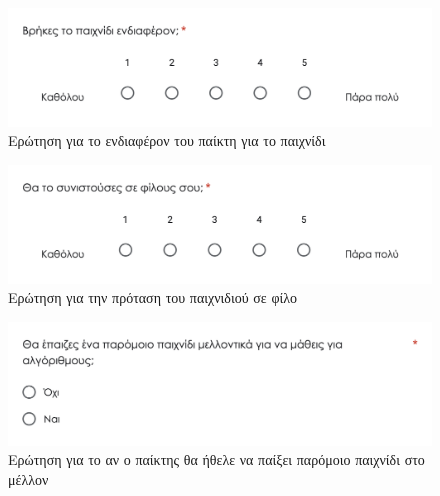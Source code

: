 \begin{figure}[H]
    \centering
    \includegraphics[width=0.8\linewidth]{sections/appendices/b/images/survey_game_interest}
    \caption{Ερώτηση για το ενδιαφέρον του παίκτη για το παιχνίδι}
    \label{fig:survey_game_interest}
\end{figure}

\begin{figure}[H]
    \centering
    \includegraphics[width=0.8\linewidth]{sections/appendices/b/images/survey_friend_reccomendation}
    \caption{Ερώτηση για την πρόταση του παιχνιδιού σε φίλο}
    \label{fig:survey_friend_reccomendation}
\end{figure}

\begin{figure}[H]
    \centering
    \includegraphics[width=0.8\linewidth]{sections/appendices/b/images/survey_similar_game_in_the_future}
    \caption{Ερώτηση για το αν ο παίκτης θα ήθελε να παίξει παρόμοιο παιχνίδι στο μέλλον}
    \label{fig:survey_similar_game_in_the_future}
\end{figure}
